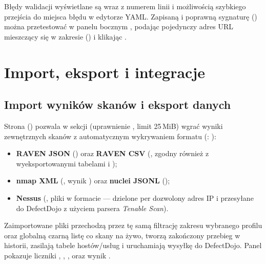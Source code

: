 \documentclass[10pt,a4paper]{article}
\begin{document}
Błędy walidacji wyświetlane są wraz z numerem linii i możliwością szybkiego przejścia do miejsca błędu w edytorze YAML. Zapisaną i poprawną sygnaturę () można przetestować w panelu bocznym , podając pojedynczy adres URL mieszczący się w zakresie () i klikając .


\section{Import, eksport i integracje}

\subsection{Import wyników skanów i eksport danych}

Strona  () pozwala w sekcji  (uprawnienie , limit 25\,MiB) wgrać wyniki zewnętrznych skanów z automatycznym wykrywaniem formatu (: ):
\begin{itemize}
  \item \textbf{RAVEN JSON} () oraz \textbf{RAVEN CSV} (, zgodny również z wyeksportowanymi tabelami  i );
  \item \textbf{nmap XML} (, wynik ) oraz \textbf{nuclei JSONL} ();
  \item \textbf{Nessus} (, pliki  w formacie  --- dzielone per dozwolony adres IP i przesyłane do DefectDojo z użyciem parsera \emph{Tenable Scan}).
\end{itemize}

Zaimportowane pliki przechodzą przez tę samą filtrację zakresu wybranego profilu oraz globalną czarną listę co skany na żywo, tworzą zakończony przebieg w historii, zasilają tabele hostów/usług i uruchamiają wysyłkę do DefectDojo. Panel  pokazuje liczniki , , ,  oraz wynik .
\end{document}
